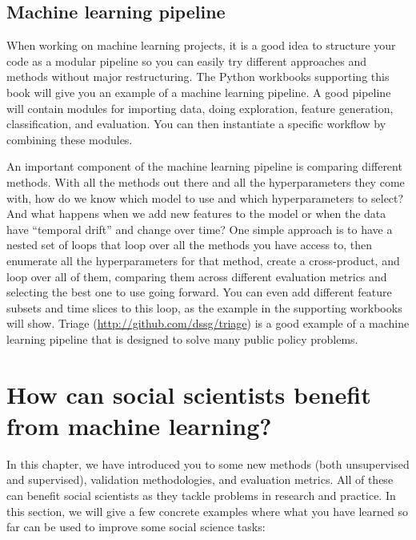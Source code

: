 \documentclass[]{krantz}
\begin{document}
\subsection{Machine learning pipeline}\label{machine-learning-pipeline}

When working on machine learning projects, it is a good idea to
structure your code as a modular pipeline so you can easily try
different approaches and methods without major restructuring. The Python
workbooks supporting this book will give you an example of a machine
learning pipeline. A good pipeline will contain modules for importing
data, doing exploration, feature generation, classification, and
evaluation. You can then instantiate a specific workflow by combining
these modules.

An important component of the machine learning pipeline is comparing
different methods. With all the methods out there and all the
hyperparameters they come with, how do we know which model to use and
which hyperparameters to select? And what happens when we add new
features to the model or when the data have ``temporal drift'' and
change over time? One simple approach is to have a nested set of loops
that loop over all the methods you have access to, then enumerate all
the hyperparameters for that method, create a cross-product, and loop
over all of them, comparing them across different evaluation metrics and
selecting the best one to use going forward. You can even add different
feature subsets and time slices to this loop, as the example in the
supporting workbooks will show. Triage
(\url{http://github.com/dssg/triage}) is a good example of a machine
learning pipeline that is designed to solve many public policy problems.

\section{How can social scientists benefit from machine
learning?}\label{how-can-social-scientists-benefit-from-machine-learning}

In this chapter, we have introduced you to some new methods (both
unsupervised and supervised), validation methodologies, and evaluation
metrics. All of these can benefit social scientists as they tackle
problems in research and practice. In this section, we will give a few
concrete examples where what you have learned so far can be used to
improve some social science tasks:
\end{document}
